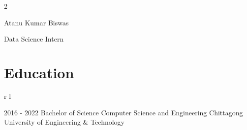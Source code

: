 \documentclass[
	10pt, %
]{RESUME}
\begin{document}
\begin{paracol}{2} %


	\parbox[][0.11\textheight][c]{\linewidth}{ %
		\centering %

		{\sffamily\Huge Atanu Kumar Biswas} %

		\medskip %

		{\cursivefont\Huge\textcolor{headings}{Data Science Intern}}

		\vfill %

	}



	\section{Education}





	\begin{supertabular}{r l} %


		\qualificationentry
		{2016 - 2022} %
		{Bachelor of Science} %
		{} %
		{Computer Science and Engineering } %
		{Chittagong University of Engineering \& Technology} %


\end{supertabular}
\end{paracol}
\end{document}
